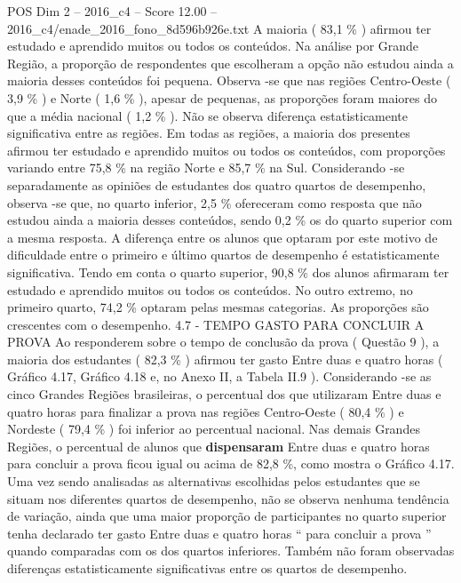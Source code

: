 \begin{textsample}{POS Dim 2 – 2016\_c4 – Score 12.00 – 2016\_c4/enade\_2016\_fono\_8d596b926e.txt}
A maioria ( 83,1 \% ) afirmou ter estudado e aprendido muitos ou todos os conteúdos.
Na análise por Grande Região, a proporção de respondentes que escolheram a opção não estudou ainda a maioria desses conteúdos foi pequena.
Observa -se que nas regiões Centro-Oeste ( 3,9 \% ) e Norte ( 1,6 \% ), apesar de pequenas, as proporções foram maiores do que a média nacional ( 1,2 \% ).
Não se observa diferença estatisticamente significativa entre as regiões.
Em todas as regiões, a maioria dos presentes afirmou ter estudado e aprendido muitos ou todos os conteúdos, com proporções variando entre 75,8 \% na região Norte e 85,7 \% na Sul.
Considerando -se separadamente as opiniões de estudantes dos quatro quartos de desempenho, observa -se que, no quarto inferior, 2,5 \% ofereceram como resposta que não estudou ainda a maioria desses conteúdos, sendo 0,2 \% os do quarto superior com a mesma resposta.
A diferença entre os alunos que optaram por este motivo de dificuldade entre o primeiro e último quartos de desempenho é estatisticamente significativa.
Tendo em conta o quarto superior, 90,8 \% dos alunos afirmaram ter estudado e aprendido muitos ou todos os conteúdos.
No outro extremo, no primeiro quarto, 74,2 \% optaram pelas mesmas categorias.
As proporções são crescentes com o desempenho. 4.7 - TEMPO GASTO PARA CONCLUIR A PROVA Ao responderem sobre o tempo de conclusão da prova ( Questão 9 ), a maioria dos estudantes ( 82,3 \% ) afirmou ter gasto Entre duas e quatro horas ( Gráfico 4.17, Gráfico 4.18 e, no Anexo II, a Tabela II.9 ).
Considerando -se as cinco Grandes Regiões brasileiras, o percentual dos que utilizaram Entre duas e quatro horas para finalizar a prova nas regiões Centro-Oeste ( 80,4 \% ) e Nordeste ( 79,4 \% ) foi inferior ao percentual nacional.
Nas demais Grandes Regiões, o percentual de alunos que \textbf{dispensaram} Entre duas e quatro horas para concluir a prova ficou igual ou acima de 82,8 \%, como mostra o Gráfico 4.17.
Uma vez sendo analisadas as alternativas escolhidas pelos estudantes que se situam nos diferentes quartos de desempenho, não se observa nenhuma tendência de variação, ainda que uma maior proporção de participantes no quarto superior tenha declarado ter gasto Entre duas e quatro horas “ para concluir a prova ” quando comparadas com os dos quartos inferiores.
Também não foram observadas diferenças estatisticamente significativas entre os quartos de desempenho.

\end{textsample}
